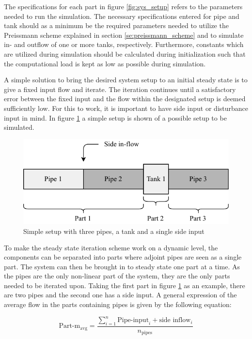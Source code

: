 The specifications for each part in figure \ref{fig:sys_setup} refers to the parameters needed to run the simulation.
The necessary specifications entered for pipe and tank should as a minimum be the required parameters needed to utilize the Preissmann scheme explained in section \ref{se:preissmann_scheme} and to simulate in- and outflow of one or more tanks, respectively. Furthermore, constants which are utilized during simulation should be calculated during initialization such that the computational load is kept as low as possible during simulation. 

A simple solution to bring the desired system setup to an initial steady state is to give a fixed input flow and iterate. 
The iteration continues until a satisfactory error between the fixed input and the flow within the designated setup is deemed sufficiently low. For this to work, it is important to have side input or disturbance input in mind. In figure \ref{fig:simple_sewer} a simple setup is shown of a possible setup to be simulated. 

\begin{figure}[H]
\centering
\includegraphics[width=0.55 \textwidth]{report/simulation/pictures/simple_sewer.pdf}
\caption{Simple setup with three pipes, a tank and a single side input}
\label{fig:simple_sewer}
\end{figure}

To make the steady state iteration scheme work on a dynamic level, the components can be separated into parts where adjoint pipes are seen as a single part. The system can then be brought in to steady state one part at a time. As the pipes are the only non-linear part of the system, they are the only parts needed to be iterated upon. Taking the first part in figure \ref{fig:simple_sewer} as an example, there are two pipes and the second one has a side input.
A general expression of the average flow in the parts containing pipes is given by the following equation:

\begin{equation}
 \text{Part-m}_{\text{avg}}	=  \frac{ \sum\limits_{i=1}^n \text{Pipe-input}_i + \text{side inflow}_i }{ n_{\text{pipes}} } 
 \end{equation} \label{avg_init_flow}

